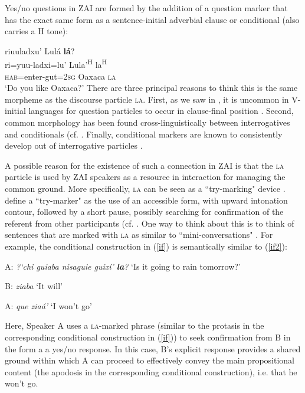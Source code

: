 Yes/no questions in ZAI are formed by the addition of a question marker that has the exact same form as a sentence-initial adverbial clause or conditional (also carries a H tone):

\ea\label{yes/no}
riuuladxu' Lul\'{a} \textbf{l\'{a}}? \\
ri=yuu-ladxi=lu' Lula'\textsuperscript{H} la\textsuperscript{H}  \\
\textsc{hab}=enter-gut=2\textsc{sg} Oaxaca \textsc{la}  \\
\glt `Do you like Oaxaca?' 
\z
There are three principal reasons to think this is the same morpheme as the discourse particle \textsc{la}. First, as we saw in , it is uncommon in V-initial languages for question particles to occur in clause-final position \citep{payne1990}. Second, common morphology has been found cross-linguistically between interrogatives and conditionals (cf. \citealt{haiman1978}. Finally, conditional markers are known to consistently develop out of interrogative particles \citep[296]{konig2007}.

A possible reason for the existence of such a connection in ZAI is that the \textsc{la} particle is used by ZAI speakers as a resource in interaction for managing the common ground. More specifically, \textsc{la} can be seen as a ``try-marking" device \citep{sacks1974}. \citet{sacks1974} define a ``try-marker" as the use of an accessible form, with upward intonation contour, followed by a short pause, possibly searching for confirmation of the referent from other participants (cf. \citealt{pekarek2011}. One way to think about this is to think of sentences that are marked with \textsc{la} as similar to ``mini-conversations" \citep[292]{thompson2007}. For example, the conditional construction in (\ref{if}) is semantically similar to (\ref{if2}):

\ea\label{if2}
A: \textit{{?`}chi guiaba nisaguie guix\'{i}' \textbf{la}?}  
 `Is it going to rain tomorrow?'

B: \textit{ziaba} 
 `It will'

A: \textit{que zia\'{a}'} 
`I won't go' 

\z

Here, Speaker A uses a \textsc{la}-marked phrase (similar to the protasis in the corresponding conditional construction in (\ref{if})) to seek confirmation from B in the form a a yes/no response. In this case, B's explicit response provides a shared ground within which A can proceed to effectively convey the main propositional content (the apodosis in the corresponding conditional construction), i.e. that he won't go. 

